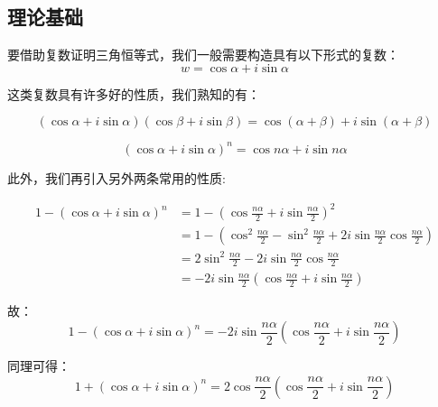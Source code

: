 
\begin{issues}
\issueTODO
{}
\end{issues}


\subsection{理论基础}
要借助复数证明三角恒等式，我们一般需要构造具有以下形式的复数：
$$w=\cos \alpha+i\sin\alpha$$

这类复数具有许多好的性质，我们熟知的有：

\begin{equation}%
(\cos\alpha+i\sin\alpha)(\cos\beta+i\sin\beta)=\cos(\alpha+\beta)+i\sin(\alpha+\beta)
\end{equation}

\begin{equation}%
(\cos\alpha+i\sin\alpha)^n=\cos n\alpha+i\sin n\alpha
\end{equation}

此外，我们再引入另外两条常用的性质:

$$\begin{aligned}
 1-(\cos\alpha+i\sin\alpha)^n&=1-\left(\cos{\frac{n\alpha}2+i\sin{\frac{n\alpha}2}}\right)^{2}\\ &=1-\left(\cos^2{\frac{n\alpha}2}-\sin^2{\frac{n\alpha}2}+2i\sin{\frac{n\alpha}2}\cos{\frac{n\alpha}2}\right)\\ &=2\sin^2{\frac{n\alpha}2}-2i\sin{\frac{n\alpha}2}\cos{\frac{n\alpha}2}\\ &=-2i\sin{\frac{n\alpha}2}\left(\cos{\frac{n\alpha}2}+i\sin{\frac{n\alpha}2}\right) 
\end{aligned}$$

故：
\begin{equation}
1-(\cos\alpha+i\sin\alpha)^n=-2i\sin{\frac{n\alpha}2}\left(\cos{\frac{n\alpha}2}+i\sin{\frac{n\alpha}2}\right)
\end{equation}

同理可得：
\begin{equation}%
1+(\cos\alpha+i\sin\alpha)^n=2\cos{\frac{n\alpha}2}\left(\cos{\frac{n\alpha}2}+i\sin{\frac{n\alpha}2}\right)
\end{equation}

